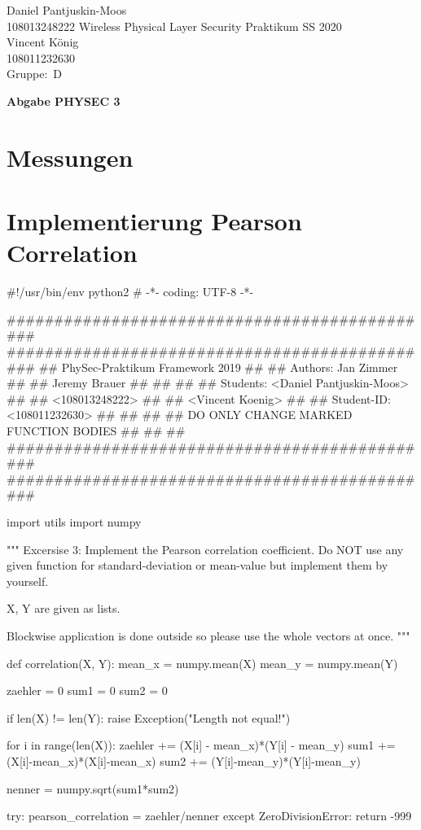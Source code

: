 \documentclass[12pt,a4paper]{article}
\newcommand{\student}{Daniel Pantjuskin-Moos\\ 108013248222 } %
\newcommand{\partner}{Vincent König\\ 108011232630} %
\newcommand{\group}{D} %
\newcommand{\hwheadtwo}{$ $
  \vspace{-2cm}
  
\noindent \student \qquad \qquad  Wireless Physical Layer Security Praktikum \hfill SS 2020 \\
\noindent \partner \\
\noindent Gruppe:~\group\\
$ $

  
\begin{center}    
{\Large \bf Abgabe PHYSEC 3}
\end{center}
}
\begin{document}
\hwheadtwo

\section{Messungen}

\section{Implementierung Pearson Correlation}

\begin{python}
#!/usr/bin/env python2
# -*- coding: UTF-8 -*-

##############################################
##############################################
##   PhySec-Praktikum Framework 2019        ##
##   Authors: Jan Zimmer                    ##
##            Jeremy Brauer                 ##
##                                          ##
##   Students:   <Daniel Pantjuskin-Moos>   ##
##               <108013248222>             ##
##               <Vincent Koenig>           ##
##   Student-ID: <108011232630>             ##
##                                          ##
##   DO ONLY CHANGE MARKED FUNCTION BODIES  ##
##                                          ##
##############################################
##############################################


import utils
import numpy

"""
Excersise 3:
Implement the Pearson correlation coefficient.
Do NOT use any given function for standard-deviation or mean-value but implement them by yourself.

X, Y are given as lists.

Blockwise application is done outside so please use the whole vectors at once.
"""

def correlation(X, Y):
    mean_x = numpy.mean(X)
    mean_y = numpy.mean(Y)

    zaehler = 0
    sum1 = 0
    sum2 = 0

    if len(X) != len(Y):
        raise Exception("Length not equal!\n")

   
    for i in range(len(X)):
        zaehler += (X[i] - mean_x)*(Y[i] - mean_y)
        sum1 += (X[i]-mean_x)*(X[i]-mean_x)
        sum2 += (Y[i]-mean_y)*(Y[i]-mean_y)

    nenner = numpy.sqrt(sum1*sum2)

    try:
        pearson_correlation = zaehler/nenner
    except ZeroDivisionError:
        return -999
    

\end{python}
\end{document}
